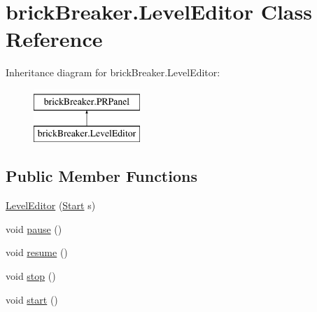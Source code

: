 \hypertarget{classbrick_breaker_1_1_level_editor}{
\section{brickBreaker.LevelEditor Class Reference}
\label{classbrick_breaker_1_1_level_editor}
}
Inheritance diagram for brickBreaker.LevelEditor:\begin{figure}[H]
\begin{center}
\leavevmode
\includegraphics[height=2cm]{classbrick_breaker_1_1_level_editor}
\end{center}
\end{figure}
\subsection*{Public Member Functions}
\begin{DoxyCompactItemize}
\item 
\hyperlink{classbrick_breaker_1_1_level_editor_a7bd55dad6633ded18cb4fad7cf6bbeac}{LevelEditor} (\hyperlink{classbrick_breaker_1_1_start}{Start} s)
\item 
void \hyperlink{classbrick_breaker_1_1_level_editor_a5c1da01da393e14dbd38039bc457f713}{pause} ()
\item 
void \hyperlink{classbrick_breaker_1_1_level_editor_a25e9ea0a6e91f1848c3b76f66a238789}{resume} ()
\item 
void \hyperlink{classbrick_breaker_1_1_level_editor_aa38941ac69b2b38f472fd402d3e33e40}{stop} ()
\item 
void \hyperlink{classbrick_breaker_1_1_level_editor_ab2df7eb7b75f4e87b25c4b2d9422dc3d}{start} ()
\end{DoxyCompactItemize}
